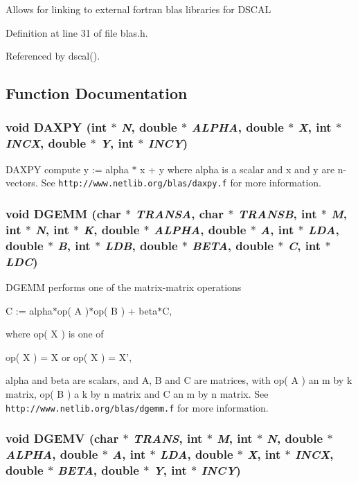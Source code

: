 Allows for linking to external fortran blas libraries for DSCAL 

Definition at line 31 of file blas.h.

Referenced by dscal().

\subsection{Function Documentation}
\subsubsection{\setlength{\rightskip}{0pt plus 5cm}void DAXPY (int $\ast$ {\em N}, double $\ast$ {\em ALPHA}, double $\ast$ {\em X}, int $\ast$ {\em INCX}, double $\ast$ {\em Y}, int $\ast$ {\em INCY})}\label{blas_8h_fd31fa1cca0fac421a6e1537bc6e72d5_fd31fa1cca0fac421a6e1537bc6e72d5}


DAXPY compute y := alpha $\ast$ x + y where alpha is a scalar and x and y are n-vectors. See {\tt http://www.netlib.org/blas/daxpy.f} for more information. 
\subsubsection{\setlength{\rightskip}{0pt plus 5cm}void DGEMM (char $\ast$ {\em TRANSA}, char $\ast$ {\em TRANSB}, int $\ast$ {\em M}, int $\ast$ {\em N}, int $\ast$ {\em K}, double $\ast$ {\em ALPHA}, double $\ast$ {\em A}, int $\ast$ {\em LDA}, double $\ast$ {\em B}, int $\ast$ {\em LDB}, double $\ast$ {\em BETA}, double $\ast$ {\em C}, int $\ast$ {\em LDC})}\label{blas_8h_41ad45bae108ad2d62ffa2c2b136b771_41ad45bae108ad2d62ffa2c2b136b771}


DGEMM performs one of the matrix-matrix operations

C := alpha$\ast$op( A )$\ast$op( B ) + beta$\ast$C,

where op( X ) is one of

op( X ) = X or op( X ) = X',

alpha and beta are scalars, and A, B and C are matrices, with op( A ) an m by k matrix, op( B ) a k by n matrix and C an m by n matrix. See {\tt http://www.netlib.org/blas/dgemm.f} for more information. 
\subsubsection{\setlength{\rightskip}{0pt plus 5cm}void DGEMV (char $\ast$ {\em TRANS}, int $\ast$ {\em M}, int $\ast$ {\em N}, double $\ast$ {\em ALPHA}, double $\ast$ {\em A}, int $\ast$ {\em LDA}, double $\ast$ {\em X}, int $\ast$ {\em INCX}, double $\ast$ {\em BETA}, double $\ast$ {\em Y}, int $\ast$ {\em INCY})}\label{blas_8h_cbb45855779b45da0c0cda7f5a889696_cbb45855779b45da0c0cda7f5a889696}



